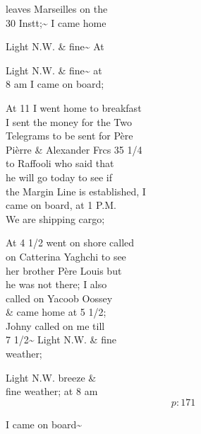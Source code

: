 \documentclass{report}
\begin{document}


	\par{
 	leaves Marseilles on the\ \\30 Instt;\~{} I came home\ \\
	}

	\par{
 	Light N.W. \& fine\~{} At\ \\
	}

	\par{
 	Light N.W. \& fine\~{} at\ \\8 am I came on board;\ \\
	}

	\par{
 	At 11 I went home to breakfast\ \\I sent the money for the Two\ \\Telegrams to be sent for Père\ \\Pièrre \& Alexander Frcs 35 1/4\ \\to Raffooli who said that\ \\he will go today to see if\ \\the Margin Line is established, I\ \\came on board, at 1 P.M.\ \\We are shipping cargo;\ \\
	}

	\par{
 	At 4 1/2 went on shore called\ \\on Catterina Yaghchi to see\ \\her brother Père Louis but\ \\he was not there; I also\ \\called on Yacoob Oossey\ \\\& came home at 5 1/2;\ \\Johny called on me till\ \\7 1/2\~{} Light N.W. \& fine\ \\weather;\ \\
	}

	\par{
 	Light N.W. breeze \&\ \\fine weather; at 8 am\ \\
  \[p: 171 \]

	}



	\par{
 	I came on board\~{}\ \\
	}
\end{document}
